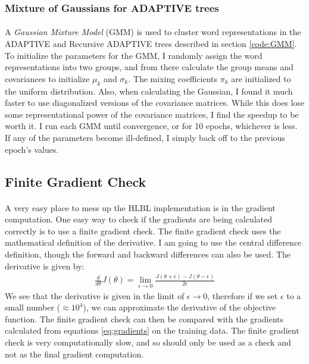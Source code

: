 \subsubsection{Mixture of Gaussians for ADAPTIVE trees}
\paragraph{}
A \emph{Gaussian Mixture Model} (GMM) is used to cluster word representations in the ADAPTIVE and Recursive ADAPTIVE trees described in section \ref{code:GMM}. To initialize the parameters for the GMM, I randomly assign the word representations into two groups, and from there calculate the group means and covariances to initialize $\mu_k$ and $\sigma_k$. The mixing coefficients $\pi_k$ are initialized to the uniform distribution. Also, when calculating the Gaussian, I found it much faster to use diagonalized versions of the covariance matrices. While this does lose some representational power of the covariance matrices, I find the speedup to be worth it. I run each GMM until convergence, or for 10 epochs, whichever is less. If any of the parameters become ill-defined, I simply back off to the previous epoch's values. 

\subsection{Finite Gradient Check}
\paragraph{}
A very easy place to mess up the HLBL implementation is in the gradient computation. One easy way to check if the gradients are being calculated correctly is to use a finite gradient check. The finite gradient check uses the mathematical definition of the derivative. I am going to use the central difference definition, though the forward and backward differences can also be used. The derivative is given by:
\begin{align}
\frac{d}{d\theta} J(\theta) = \lim_{\epsilon \to 0} \frac{ J({\theta + \epsilon} )- J({\theta - \epsilon}) } {2 \epsilon}
\end{align}
We see that the derivative is given in the limit of $\epsilon \to 0$, therefore if we set $\epsilon$ to a small number ($\approx10^4$), we can approximate the derivative of the objective function. The finite gradient check can then be compared with the gradients calculated from equations \ref{eq:gradients} on the training data. The finite gradient check is very computationally slow, and so should only be used as a check and not as the final gradient computation.

